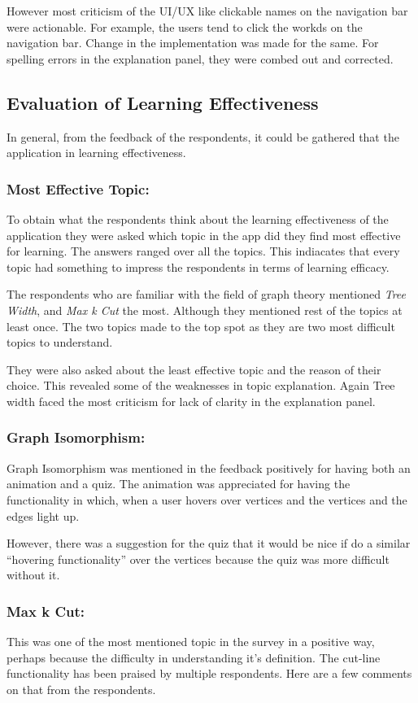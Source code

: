 However most criticism of the UI/UX like clickable names on the navigation bar
were actionable.  For example, the users tend to click the workds on the
navigation bar. Change in the implementation was made for the same. For
spelling errors in the explanation panel, they were combed out and corrected.


\subsection{Evaluation of Learning Effectiveness}
In general, from the feedback of the respondents, it could be gathered
that the application in learning effectiveness.

\subsubsection{Most Effective Topic:}
To obtain what the respondents think about the learning effectiveness of the
application they were asked which topic in the app did they find most effective
for learning. The answers ranged over all the topics. This indiacates that every
topic had something to impress the respondents in terms of learning efficacy.


The respondents who are familiar with the field of graph theory mentioned
\emph{Tree Width}, and \emph{Max k Cut} the most. Although they mentioned rest
of the topics at least once. The two topics made to the top spot as they are
two most difficult topics to understand.

They were also asked about the least effective topic and the reason of their choice. 
This revealed some of the weaknesses in topic explanation. Again Tree width
faced the most criticism for lack of clarity in the explanation panel. 

\subsubsection{Graph Isomorphism:}
Graph Isomorphism was mentioned in the feedback positively for having both an
animation and a quiz. The animation was appreciated for having the
functionality in which, when a user hovers over vertices and the vertices and
the edges light up. 

However, there was a suggestion for the quiz 
that it would be nice if do a similar ``hovering functionality'' over the
vertices because the quiz was more difficult without it.

\subsubsection{Max k Cut:}
This was one of the most mentioned topic in the survey in a positive way,
perhaps because the difficulty in understanding it's definition. The cut-line
functionality has been praised by multiple respondents. Here are a few
comments on that from the respondents.

